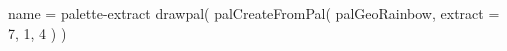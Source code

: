 \documentclass{standalone}
\begin{document}
\begin{luadraw*}{name = palette-extract}
drawpal(
  palCreateFromPal(
    palGeoRainbow,
    {extract = {7, 1, 4}}
  )
)
\end{luadraw*}
\end{document}
